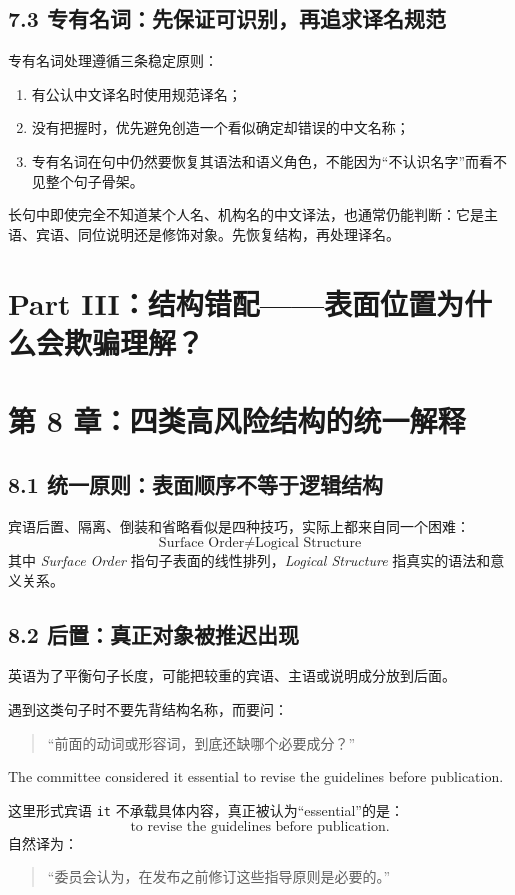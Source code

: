 \documentclass[11pt,a4paper]{ctexart}
\begin{document}
\subsection{7.3 专有名词：先保证可识别，再追求译名规范}
专有名词处理遵循三条稳定原则：
\begin{enumerate}
  \item 有公认中文译名时使用规范译名；
  \item 没有把握时，优先避免创造一个看似确定却错误的中文名称；
  \item 专有名词在句中仍然要恢复其语法和语义角色，不能因为“不认识名字”而看不见整个句子骨架。
\end{enumerate}

\begin{warn}[不要把专有名词变成结构障碍]
长句中即使完全不知道某个人名、机构名的中文译法，也通常仍能判断：它是主语、宾语、同位说明还是修饰对象。先恢复结构，再处理译名。
\end{warn}

\newpage
\section{Part III：结构错配——表面位置为什么会欺骗理解？}

\section{第 8 章：四类高风险结构的统一解释}

\subsection{8.1 统一原则：表面顺序不等于逻辑结构}
宾语后置、隔离、倒装和省略看似是四种技巧，实际上都来自同一个困难：
\[
\boxed{\text{Surface Order} \neq \text{Logical Structure}}
\]
其中 \textit{Surface Order} 指句子表面的线性排列，\textit{Logical Structure} 指真实的语法和意义关系。

\subsection{8.2 后置：真正对象被推迟出现}
英语为了平衡句子长度，可能把较重的宾语、主语或说明成分放到后面。

遇到这类句子时不要先背结构名称，而要问：
\begin{quote}
“前面的动词或形容词，到底还缺哪个必要成分？”
\end{quote}

\begin{eng}[例 19]
The committee considered it essential to revise the guidelines before publication.
\end{eng}
这里形式宾语 \texttt{it} 不承载具体内容，真正被认为“essential”的是：
\[
\text{to revise the guidelines before publication}.
\]
自然译为：
\begin{quote}
“委员会认为，在发布之前修订这些指导原则是必要的。”
\end{quote}
\end{document}
